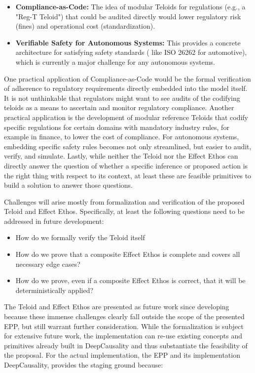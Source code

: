 \begin{itemize}
  \item \textbf{Compliance-as-Code:} The idea of modular Teloids for regulations (e.g., a "Reg-T Teloid") that could be audited
  directly would lower regulatory risk (fines) and operational cost (standardization).
  \item \textbf{Verifiable Safety for Autonomous Systems:} This provides a concrete architecture for satisfying safety standards (
  like ISO 26262 for automotive), which is currently a major challenge for any autonomous systems.
\end{itemize}


One practical application of Compliance-as-Code would be the formal verification of adherence to regulatory requirements
directly embedded into the model itself. It is not unthinkable that regulators might want to see audits of the codifying
teloids as a means to ascertain and monitor regulatory compliance. Another practical application is the development of
modular reference Teloids that codify specific regulations for certain domains with mandatory industry rules,
for example in finance, to lower the cost of compliance. For autonomous systems, embedding specific safety rules
becomes not only streamlined, but easier to audit, verify, and simulate. Lastly, while neither the Teloid nor the Effect
Ethos can directly answer the question of whether a specific inference or proposed action is the right thing
with respect to its context, at least these are feasible primitives to build a solution to answer those questions.

Challenges will arise mostly from formalization and verification of the proposed Teloid and Effect Ethos. Specifically,
at least the following questions need to be addressed in future development:

\begin{itemize}
    \item How do we formally verify the Teloid itself
    \item How do we prove that a composite Effect Ethos is complete and covers all necessary edge cases?
    \item How do we prove, even if a composite Effect Ethos is correct, that it will be deterministically applied?
\end{itemize}

The Teloid and Effect Ethos are presented as future work since developing because these immense challenges clearly
fall outside the scope of the presented EPP, but still warrant further consideration. 
While the formalization is
subject for extensive future work, the implementation can re-use existing concepts and primitives already built in
DeepCausality and thus substantiate the feasibility of the proposal. For the actual implementation, the EPP and its
implementation DeepCausality, provides the staging ground because:

